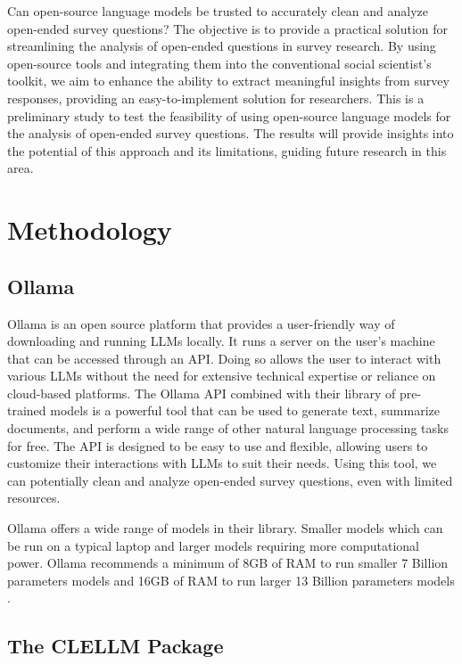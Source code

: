 \documentclass[
  authoryear,
  preprint,
  3p]{elsarticle}
\begin{document}
Can open-source language models be trusted to accurately clean and
analyze open-ended survey questions? The objective is to provide a
practical solution for streamlining the analysis of open-ended questions
in survey research. By using open-source tools and integrating them into
the conventional social scientist's toolkit, we aim to enhance the
ability to extract meaningful insights from survey responses, providing
an easy-to-implement solution for researchers. This is a preliminary
study to test the feasibility of using open-source language models for
the analysis of open-ended survey questions. The results will provide
insights into the potential of this approach and its limitations,
guiding future research in this area.

\section{Methodology}\label{methodology}

\subsection{Ollama}\label{ollama}

Ollama is an open source platform that provides a user-friendly way of
downloading and running LLMs locally. It runs a server on the user's
machine that can be accessed through an API. Doing so allows the user to
interact with various LLMs without the need for extensive technical
expertise or reliance on cloud-based platforms. The Ollama API combined
with their library of pre-trained models is a powerful tool that can be
used to generate text, summarize documents, and perform a wide range of
other natural language processing tasks for free. The API is designed to
be easy to use and flexible, allowing users to customize their
interactions with LLMs to suit their needs. Using this tool, we can
potentially clean and analyze open-ended survey questions, even with
limited resources.

Ollama offers a wide range of models in their library. Smaller models
which can be run on a typical laptop and larger models requiring more
computational power. Ollama recommends a minimum of 8GB of RAM to run
smaller 7 Billion parameters models and 16GB of RAM to run larger 13
Billion parameters models \citep{ollama24}.

\subsection{The CLELLM Package}\label{the-clellm-package}
\end{document}
